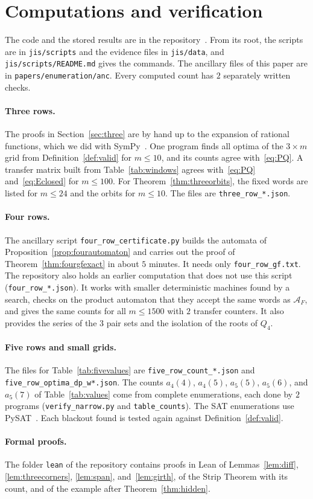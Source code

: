 \section{Computations and verification}\label{sec:verify}

The code and the stored results are in the repository~\cite{repo}. From its
root, the scripts are in \nolinkurl{jis/scripts} and the evidence files in
\nolinkurl{jis/data}, and \nolinkurl{jis/scripts/README.md} gives the commands.
The ancillary files of this paper are in \nolinkurl{papers/enumeration/anc}.
Every computed count has $2$ separately written checks.

\paragraph{Three rows.} The proofs in Section~\ref{sec:three} are by hand up to
the expansion of rational functions, which we did with SymPy~\cite{sympy2017}.
One program finds all optima of the
$3\times m$ grid from Definition~\ref{def:valid} for $m\le10$, and its counts
agree with~\eqref{eq:PQ}. A transfer matrix built from Table~\ref{tab:windows}
agrees with~\eqref{eq:PQ} and~\eqref{eq:Eclosed} for $m\le100$. For
Theorem~\ref{thm:threeorbits}, the fixed words are listed for $m\le24$ and the
orbits for $m\le10$. The files are \nolinkurl{three_row_*.json}.

\paragraph{Four rows.} The ancillary script \nolinkurl{four_row_certificate.py}
builds the automata of Proposition~\ref{prop:fourautomaton} and carries out the
proof of Theorem~\ref{thm:fourgfexact} in about $5$ minutes. It needs only
\nolinkurl{four_row_gf.txt}. The repository also holds an earlier computation
that does not use this script (\nolinkurl{four_row_*.json}). It works with
smaller deterministic machines found by a search, checks on the product
automaton that they accept the same words as $\mathcal A_F$, and gives the
same counts for all $m\le1500$ with $2$ transfer counters. It also provides the
series of the $3$ pair sets and the isolation of the roots of $Q_4$.

\paragraph{Five rows and small grids.} The files for Table~\ref{tab:fivevalues}
are \nolinkurl{five_row_count_*.json} and \nolinkurl{five_row_optima_dp_w*.json}.
The counts $a_4(4)$, $a_4(5)$, $a_5(5)$, $a_5(6)$, and $a_5(7)$ of
Table~\ref{tab:values} come from complete enumerations, each done by $2$
programs (\nolinkurl{verify_narrow.py} and \nolinkurl{table_counts}). The SAT
enumerations use PySAT~\cite{pysat2018}. Each blackout found is tested again
against Definition~\ref{def:valid}.

\paragraph{Formal proofs.} The folder \nolinkurl{lean} of the repository
contains proofs in Lean of Lemmas~\ref{lem:diff}, \ref{lem:threecorners},
\ref{lem:span}, and~\ref{lem:girth}, of the Strip Theorem with its count, and of
the example after Theorem~\ref{thm:hidden}.
